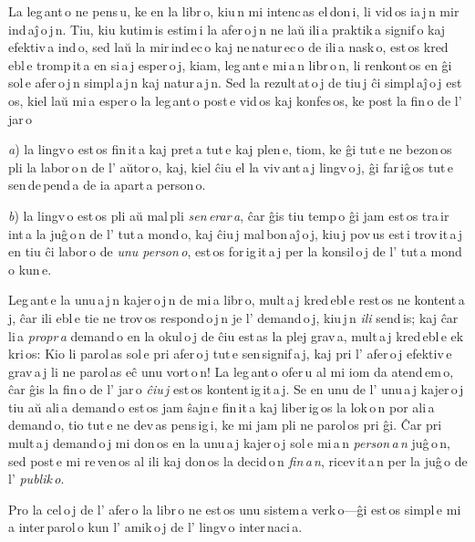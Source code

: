 La leg\,ant\,o ne pens\,u, ke en la libr\,o, kiu\,n mi intenc\,as el\,don\,i, li vid\,os ia\,j\,n mir\,ind\,aĵ\,o\,j\,n. Tiu, kiu kutim\,is estim\,i la afer\,o\,j\,n ne laŭ ili\,a praktik\,a signif\,o kaj efektiv\,a ind\,o, sed laŭ la mir\,ind\,ec\,o kaj ne\,natur\,ec\,o de ili\,a nask\,o, est\,os kred\,ebl\,e tromp\,it\,a en si\,a\,j esper\,o\,j, kiam, leg\,ant\,e mi\,a\,n libr\,o\,n, li renkont\,os en ĝi sol\,e afer\,o\,j\,n simpl\,a\,j\,n kaj natur\,a\,j\,n. Sed la rezult\,at\,o\,j de tiu\,j ĉi simpl\,aĵ\,o\,j est\,os, kiel laŭ mi\,a esper\,o la leg\,ant\,o post\,e vid\,os kaj konfes\,os, ke post la fin\,o de l' jar\,o

\emph{a}) la lingv\,o est\,os fin\,it\,a kaj pret\,a tut\,e kaj plen\,e, tiom, ke ĝi tut\,e ne bezon\,os pli la labor\,o\,n de l' aŭtor\,o, kaj, kiel ĉiu el la viv\,ant\,a\,j lingv\,o\,j, ĝi far\,iĝ\,os tut\,e sen\,de\,pend\,a de ia apart\,a person\,o.

\emph{b}) la lingv\,o est\,os pli aŭ mal\,pli \emph{sen\,erar\,a}, ĉar ĝis tiu temp\,o ĝi jam est\,os tra\,ir\,int\,a la juĝ\,o\,n de l' tut\,a mond\,o, kaj ĉiu\,j mal\,bon\,aĵ\,o\,j, kiu\,j pov\,us est\,i trov\,it\,a\,j en tiu ĉi labor\,o de \emph{unu person\,o}, est\,os for\,ig\,it\,a\,j per la konsil\,o\,j de l' tut\,a mond\,o kun\,e.

Leg\,ant\,e la unu\,a\,j\,n kajer\,o\,j\,n de mi\,a libr\,o, mult\,a\,j kred\,ebl\,e rest\,os ne kontent\,a\,j, ĉar ili ebl\,e tie ne trov\,os respond\,o\,j\,n je l' demand\,o\,j, kiu\,j\,n \emph{ili} send\,is; kaj ĉar li\,a \emph{propr\,a} demand\,o en la okul\,o\,j de ĉiu est\,as la plej grav\,a, mult\,a\,j kred\,ebl\,e ek\,kri\,os: \glqq{}Kio li parol\,as sol\,e pri afer\,o\,j tut\,e sen\,signif\,a\,j, kaj pri l' afer\,o\,j efektiv\,e grav\,a\,j li ne parol\,as eĉ unu vort\,o\,n!\grqq{} La leg\,ant\,o ofer\,u al mi iom da atend\,em\,o, ĉar ĝis la fin\,o de l' jar\,o \emph{ĉiu\,j} est\,os kontent\,ig\,it\,a\,j. Se en unu de l' unu\,a\,j kajer\,o\,j tiu aŭ ali\,a demand\,o est\,os jam ŝajn\,e fin\,it\,a kaj liber\,ig\,os la lok\,o\,n por ali\,a demand\,o, tio tut\,e ne dev\,as pens\,ig\,i, ke mi jam pli ne parol\,os pri ĝi. Ĉar pri mult\,a\,j demand\,o\,j mi don\,os en la unu\,a\,j kajer\,o\,j sol\,e mi\,a\,n \emph{person\,a\,n} juĝ\,o\,n, sed post\,e mi re\,ven\,os al ili kaj don\,os la decid\,o\,n \emph{fin\,a\,n}, ricev\,it\,a\,n per la juĝ\,o de l' \emph{publik\,o}.

Pro la cel\,o\,j de l' afer\,o la libr\,o ne est\,os unu sistem\,a verk\,o---ĝi est\,os simpl\,e mi\,a inter\,parol\,o kun l' amik\,o\,j de l' lingv\,o inter\,naci\,a.

